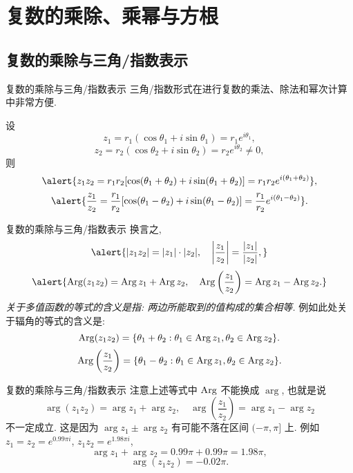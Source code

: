 \section{复数的乘除、乘幂与方根}

\subsection{复数的乘除与三角/指数表示}
\begin{frame}{复数的乘除与三角/指数表示}
	\onslide<+->
	三角/指数形式在进行复数的乘法、除法和幂次计算中非常方便.

	\onslide<+->
	\begin{theorem}
		设
		\[z_1=r_1(\cos\theta_1+i\sin\theta_1)=r_1e^{i\theta_1},\]
		\[z_2=r_2(\cos\theta_2+i\sin\theta_2)=r_2e^{i\theta_2}\neq 0,\]
		则
		\[\alert{z_1z_2=r_1r_2[\cos(\theta_1+\theta_2)+i\sin(\theta_1+\theta_2)]=r_1r_2e^{i(\theta_1+\theta_2)}},\]
		\[\alert{\frac{z_1}{z_2}=\frac{r_1}{r_2}[\cos(\theta_1-\theta_2)+i\sin(\theta_1-\theta_2)]=\frac{r_1}{r_2}e^{i(\theta_1-\theta_2)}}.\]
	\end{theorem}
\end{frame}


\begin{frame}{复数的乘除与三角/指数表示}
	\onslide<+->
	换言之,
	\[\alert{|z_1z_2|=|z_1|\cdot|z_2|,\quad\abs{\frac{z_1}{z_2}}=\frac{|z_1|}{|z_2|},}\]
	\onslide<+->
	\[\alert{\Arg(z_1z_2)=\Arg z_1+\Arg z_2,\quad
	\Arg\left(\frac{z_1}{z_2}\right)=\Arg z_1-\Arg z_2.}\]
	\onslide<+->
	\emph{关于多值函数的等式的含义是指: 两边所能取到的值构成的集合相等.}
	\onslide<+->
	例如此处关于辐角的等式的含义是:
	\[\operatorname{Arg}(z_1z_2)={\left\{\theta_1+\theta_2:\theta_1\in\operatorname{Arg} z_1,\theta_2\in\operatorname{Arg} z_2\right\}}.\]
	\[\operatorname{Arg}\left(\frac{z_1}{z_2}\right)={\left\{\theta_1-\theta_2:\theta_1\in\operatorname{Arg} z_1,\theta_2\in\operatorname{Arg} z_2\right\}}.\]
\end{frame}


\begin{frame}{复数的乘除与三角/指数表示}
	\onslide<+->
	注意上述等式中 $\operatorname{Arg}$ 不能换成 $\arg$, 也就是说
	\[\arg(z_1z_2)=\arg z_1+\arg z_2,\quad
	\arg\left(\frac{z_1}{z_2}\right)=\arg z_1-\arg z_2\]
	\alert{不一定成立}.
	\onslide<+->
	这是因为 $\arg z_1\pm\arg z_2$ 有可能不落在区间 $(-\pi,\pi]$ 上.
	\onslide<+->
	例如 $z_1=z_2=e^{0.99\pi i}$, $z_1z_2=e^{1.98\pi i}$,
	\onslide<+->
	\[\arg z_1+\arg z_2=0.99\pi+0.99\pi=1.98\pi,\]
	\onslide<+->
	\[\arg(z_1z_2)=-0.02\pi.\]
\end{frame}



